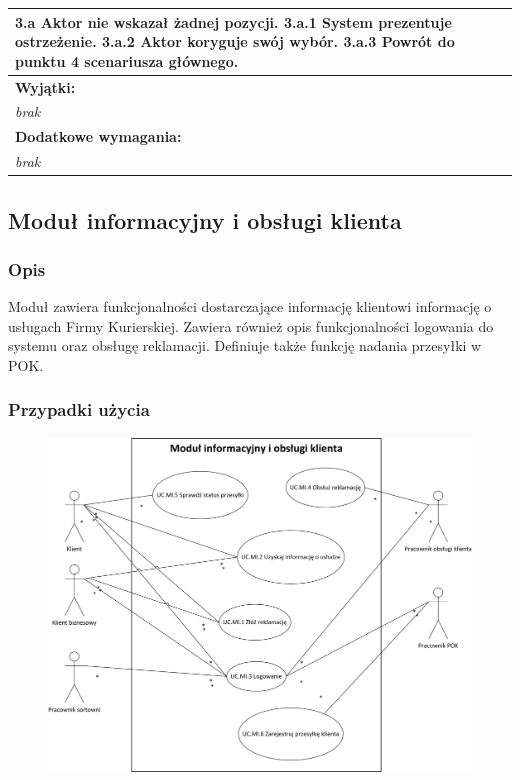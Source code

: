 \begin{center}
\begin{longtable}[h]{|p{1.6cm}|p{13.5cm}|}
\multicolumn{2}{|p{15.1cm}|}{
3.a Aktor nie wskazał żadnej pozycji. \newline
3.a.1 System prezentuje ostrzeżenie. \newline
3.a.2 Aktor koryguje swój wybór. \newline
3.a.3 Powrót do punktu 4 scenariusza głównego. 
} \\ \hline
\multicolumn{2}{|p{15.1cm}|}{\textbf{Wyjątki:}} \\
\multicolumn{2}{|p{15.1cm}|}{
\textit{brak}
} \\ \hline
\multicolumn{2}{|p{15.1cm}|}{\textbf{Dodatkowe wymagania:}} \\
\multicolumn{2}{|p{15.1cm}|}{
\textit{brak}
} \\
\hline
\end{longtable}
\end{center}

\subsection{Moduł informacyjny i obsługi klienta}
\subsubsection*{Opis}
Moduł zawiera funkcjonalności dostarczające informację klientowi informację o usługach Firmy Kurierskiej. Zawiera również opis funkcjonalności logowania do systemu oraz obsługę reklamacji. Definiuje także funkcję nadania przesyłki w POK.

\subsubsection*{Przypadki użycia}
\begin{figure}[H]
\centering
\includegraphics[width=\textwidth]{img/mod_inf_uc}
\end{figure}


